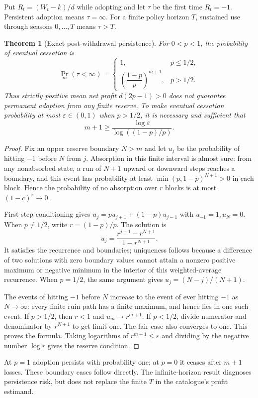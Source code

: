 \documentclass[11pt]{article}
\newtheorem{theorem}{Theorem}
\theoremstyle{remark}
\begin{document}
Put $R_t=(W_t-k)/d$ while adopting and let $\tau$ be the first time $R_t=-1$. Persistent adoption means $\tau=\infty$. For a finite policy horizon $T$, sustained use through seasons $0,\ldots,T$ means $\tau>T$.

\begin{theorem}[Exact post-withdrawal persistence]\label{ruin}
For $0<p<1$, the probability of eventual cessation is
\[
 \Pr_m(\tau<\infty)=
 \begin{cases}
 1,&p\leq1/2,\\[2mm]
 \left(\dfrac{1-p}{p}\right)^{m+1},&p>1/2.
 \end{cases}
\]
Thus strictly positive mean net profit $d(2p-1)>0$ does not guarantee permanent adoption from any finite reserve. To make eventual cessation probability at most $\varepsilon\in(0,1)$ when $p>1/2$, it is necessary and sufficient that
\[
 m+1\geq\frac{\log\varepsilon}{\log((1-p)/p)}.
\]
\end{theorem}
\begin{proof}
Fix an upper reserve boundary $N>m$ and let $u_j$ be the probability of hitting $-1$ before $N$ from $j$. Absorption in this finite interval is almost sure: from any nonabsorbed state, a run of $N+1$ upward or downward steps reaches a boundary, and this event has probability at least $\min(p,1-p)^{N+1}>0$ in each block. Hence the probability of no absorption over $r$ blocks is at most $(1-c)^r\to0$.

First-step conditioning gives
$u_j=pu_{j+1}+(1-p)u_{j-1}$ with $u_{-1}=1,u_N=0$. When $p\ne1/2$, write $r=(1-p)/p$. The solution is
\[
 u_j=\frac{r^{j+1}-r^{N+1}}{1-r^{N+1}}.
\]
It satisfies the recurrence and boundaries; uniqueness follows because a difference of two solutions with zero boundary values cannot attain a nonzero positive maximum or negative minimum in the interior of this weighted-average recurrence. When $p=1/2$, the same argument gives $u_j=(N-j)/(N+1)$.

The events of hitting $-1$ before $N$ increase to the event of ever hitting $-1$ as $N\to\infty$: every finite ruin path has a finite maximum, and hence lies in one such event. If $p>1/2$, then $r<1$ and $u_m\to r^{m+1}$. If $p<1/2$, divide numerator and denominator by $r^{N+1}$ to get limit one. The fair case also converges to one. This proves the formula. Taking logarithms of $r^{m+1}\leq\varepsilon$ and dividing by the negative number $\log r$ gives the reserve condition.
\end{proof}

At $p=1$ adoption persists with probability one; at $p=0$ it ceases after $m+1$ losses. These boundary cases follow directly. The infinite-horizon result diagnoses persistence risk, but does not replace the finite $T$ in the catalogue's profit estimand.
\end{document}

